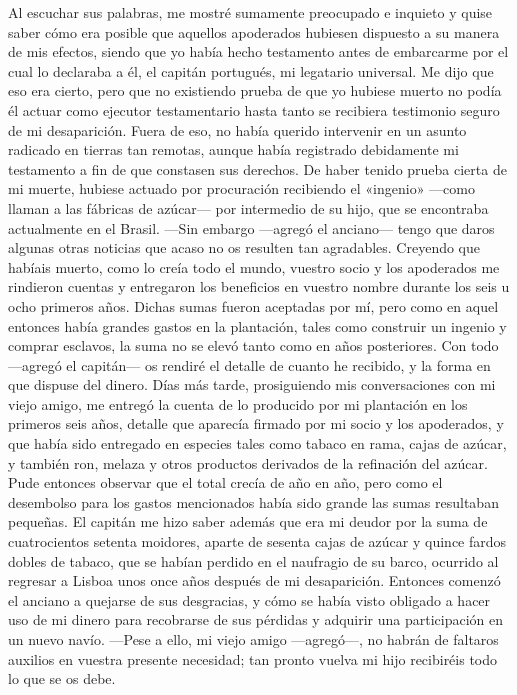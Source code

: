 \documentclass{novela}
\begin{document}
    Al escuchar sus palabras, me mostré sumamente preocupado e inquieto y quise saber cómo era posible que aquellos apoderados hubiesen dispuesto a su manera de mis efectos, siendo que yo había hecho testamento antes de embarcarme por el cual lo declaraba a él, el capitán portugués, mi legatario universal.
    Me dijo que eso era cierto, pero que no existiendo prueba de que yo hubiese muerto no podía él actuar como ejecutor testamentario hasta tanto se recibiera testimonio seguro de mi desaparición.
    Fuera de eso, no había querido intervenir en un asunto radicado en tierras tan remotas, aunque había registrado debidamente mi testamento a fin de que constasen sus derechos. De haber tenido prueba cierta de mi muerte, hubiese actuado por procuración recibiendo el «ingenio» —como llaman a las fábricas de azúcar— por intermedio de su hijo, que se encontraba actualmente en el Brasil.
    —Sin embargo —agregó el anciano— tengo que daros algunas otras noticias que acaso no os resulten tan agradables. Creyendo que habíais muerto, como lo creía todo el mundo, vuestro socio y los apoderados me rindieron cuentas y entregaron los beneficios en vuestro nombre durante los seis u ocho primeros años. Dichas sumas fueron aceptadas por mí, pero como en aquel entonces había grandes gastos en la plantación, tales como construir un ingenio y comprar esclavos, la suma no se elevó tanto como en años posteriores. Con todo —agregó el capitán— os rendiré el detalle de cuanto he recibido, y la forma en que dispuse del dinero.
    Días más tarde, prosiguiendo mis conversaciones con mi viejo amigo, me entregó la cuenta de lo producido por mi plantación en los primeros seis años, detalle que aparecía firmado por mi socio y los apoderados, y que había sido entregado en especies tales como tabaco en rama, cajas de azúcar, y también ron, melaza y otros productos derivados de la refinación del azúcar. Pude entonces observar que el total crecía de año en año, pero como el desembolso para los gastos mencionados había sido grande las sumas resultaban pequeñas.
    El capitán me hizo saber además que era mi deudor por la suma de cuatrocientos setenta moidores, aparte de sesenta cajas de azúcar y quince fardos dobles de tabaco, que se habían perdido en el naufragio de su barco, ocurrido al regresar a Lisboa unos once años después de mi desaparición.
    Entonces comenzó el anciano a quejarse de sus desgracias, y cómo se había visto obligado a hacer uso de mi dinero para recobrarse de sus pérdidas y adquirir una participación en un nuevo navío.
    —Pese a ello, mi viejo amigo —agregó—, no habrán de faltaros auxilios en vuestra presente necesidad; tan pronto vuelva mi hijo recibiréis todo lo que se os debe.
\end{document}
